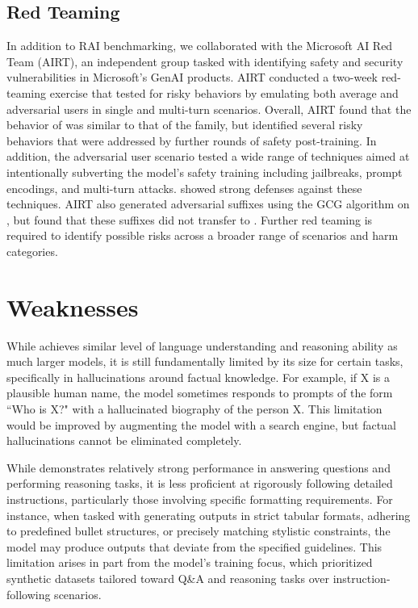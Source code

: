 \subsection{Red Teaming}

In addition to RAI benchmarking, we collaborated with the Microsoft AI Red Team (AIRT), an independent group tasked with identifying safety and security vulnerabilities in Microsoft's GenAI products. AIRT conducted a two-week red-teaming exercise that tested \model for risky behaviors by emulating both average and adversarial users in single and multi-turn scenarios. Overall, AIRT found that the behavior of \model was similar to that of the \phithree{} family, but identified several risky behaviors that were addressed by further rounds of safety post-training. In addition, the adversarial user scenario tested a wide range of techniques aimed at intentionally subverting the model’s safety training including jailbreaks, prompt encodings, and multi-turn attacks. \model showed strong defenses against these techniques. AIRT also generated adversarial suffixes using the GCG algorithm \cite{zou2023universaltransferableadversarialattacks} on \phithreemed, but found that these suffixes did not transfer to \modelwithoutspace. Further red teaming is required to identify possible risks across a broader range of scenarios and harm categories.

\section{Weaknesses}
While \model achieves similar level of language understanding and reasoning ability as much larger models, it is still fundamentally limited by its size for certain tasks, specifically in hallucinations around factual knowledge. For example, if X is a plausible human name, the model sometimes responds to prompts of the form ``Who is X?" with a hallucinated biography of the person X.   This limitation would be improved by augmenting the model with a search engine, but factual hallucinations cannot be eliminated completely.

While \model demonstrates relatively strong performance in answering questions and performing reasoning tasks, it is less proficient at rigorously following detailed instructions, particularly those involving specific formatting requirements. For instance, when tasked with generating outputs in strict tabular formats, adhering to predefined bullet structures, or precisely matching stylistic constraints, the model may produce outputs that deviate from the specified guidelines. This limitation arises in part from the model’s training focus, which prioritized synthetic datasets tailored toward Q\&A and reasoning tasks over instruction-following scenarios.

